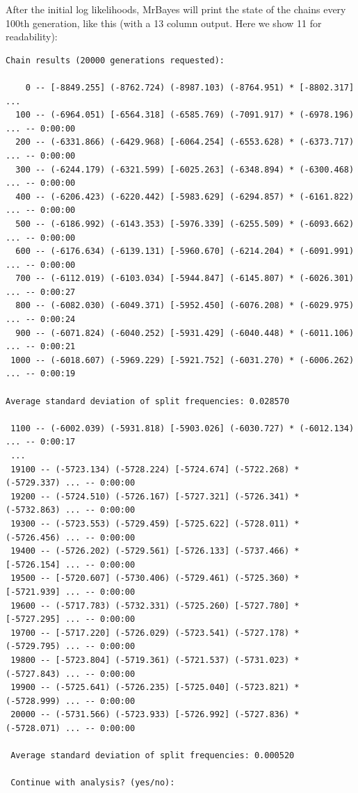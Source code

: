 \documentclass[12pt]{book}
\begin{document}
After the initial log likelihoods, MrBayes will print the state of the chains every 100th
generation, like this (with a 13 column output. Here we show 11 for readability):

\begin{Verbatim}[fontsize=\scriptsize]
Chain results (20000 generations requested):

    0 -- [-8849.255] (-8762.724) (-8987.103) (-8764.951) * [-8802.317] ...  
  100 -- (-6964.051) [-6564.318] (-6585.769) (-7091.917) * (-6978.196) ... -- 0:00:00
  200 -- (-6331.866) (-6429.968) [-6064.254] (-6553.628) * (-6373.717) ... -- 0:00:00
  300 -- (-6244.179) (-6321.599) [-6025.263] (-6348.894) * (-6300.468) ... -- 0:00:00
  400 -- (-6206.423) (-6220.442) [-5983.629] (-6294.857) * (-6161.822) ... -- 0:00:00
  500 -- (-6186.992) (-6143.353) [-5976.339] (-6255.509) * (-6093.662) ... -- 0:00:00
  600 -- (-6176.634) (-6139.131) [-5960.670] (-6214.204) * (-6091.991) ... -- 0:00:00
  700 -- (-6112.019) (-6103.034) [-5944.847] (-6145.807) * (-6026.301) ... -- 0:00:27
  800 -- (-6082.030) (-6049.371) [-5952.450] (-6076.208) * (-6029.975) ... -- 0:00:24
  900 -- (-6071.824) (-6040.252) [-5931.429] (-6040.448) * (-6011.106) ... -- 0:00:21
 1000 -- (-6018.607) (-5969.229) [-5921.752] (-6031.270) * (-6006.262) ... -- 0:00:19

Average standard deviation of split frequencies: 0.028570

 1100 -- (-6002.039) (-5931.818) [-5903.026] (-6030.727) * (-6012.134) ... -- 0:00:17
 ...
 19100 -- (-5723.134) (-5728.224) [-5724.674] (-5722.268) * (-5729.337) ... -- 0:00:00
 19200 -- (-5724.510) (-5726.167) [-5727.321] (-5726.341) * (-5732.863) ... -- 0:00:00
 19300 -- (-5723.553) (-5729.459) [-5725.622] (-5728.011) * (-5726.456) ... -- 0:00:00
 19400 -- (-5726.202) (-5729.561) [-5726.133] (-5737.466) * [-5726.154] ... -- 0:00:00
 19500 -- [-5720.607] (-5730.406) (-5729.461) (-5725.360) * [-5721.939] ... -- 0:00:00
 19600 -- (-5717.783) (-5732.331) (-5725.260) [-5727.780] * [-5727.295] ... -- 0:00:00
 19700 -- [-5717.220] (-5726.029) (-5723.541) (-5727.178) * (-5729.795) ... -- 0:00:00
 19800 -- [-5723.804] (-5719.361) (-5721.537) (-5731.023) * (-5727.843) ... -- 0:00:00
 19900 -- (-5725.641) (-5726.235) [-5725.040] (-5723.821) * (-5728.999) ... -- 0:00:00
 20000 -- (-5731.566) (-5723.933) [-5726.992] (-5727.836) * (-5728.071) ... -- 0:00:00

 Average standard deviation of split frequencies: 0.000520

 Continue with analysis? (yes/no): 
\end{Verbatim}
\end{document}
